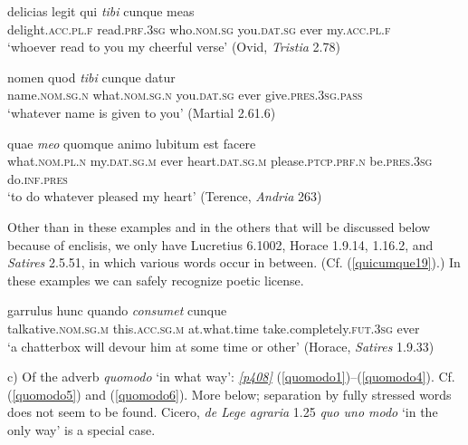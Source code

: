 \begin{exe}
\ex
\gll delicias legit qui \emph{tibi} cunque meas\\
delight.\textsc{acc.pl.f} read.\textsc{prf.3sg} who.\textsc{nom.sg} you.\textsc{dat.sg} ever my.\textsc{acc.pl.f}\\
\trans `whoever read to you my cheerful verse' (Ovid, \textit{Tristia} 2.78)
\label{quicumque16}
\end{exe}

\begin{exe}
\ex
\gll nomen quod \emph{tibi} cunque datur\\
name.\textsc{nom.sg.n} what.\textsc{nom.sg.n} you.\textsc{dat.sg} ever give.\textsc{pres.3sg.pass}\\
\trans `whatever name is given to you' (Martial 2.61.6)
\label{quicumque17}
\end{exe}

\begin{exe}
\ex
\gll quae \emph{meo} quomque animo lubitum est facere\\
what.\textsc{nom.pl.n} my.\textsc{dat.sg.m} ever heart.\textsc{dat.sg.m} please.\textsc{ptcp.prf.n} be.\textsc{pres.3sg} do.\textsc{inf.pres}\\
\trans `to do whatever pleased my heart' (Terence, \textit{Andria} 263)
\label{quicumque18}
\end{exe}

Other than in these examples and in the others that will be discussed below because of enclisis, we only have Lucretius 6.1002, Horace 1.9.14, 1.16.2, and \textit{Satires} 2.5.51, in which various words occur in between. (Cf. (\ref{quicumque19}).) In these examples we can safely recognize poetic license.

\begin{exe}
\ex
\gll garrulus hunc quando \emph{consumet} cunque\\
talkative.\textsc{nom.sg.m} this.\textsc{acc.sg.m} at.what.time take.completely.\textsc{fut.3sg} ever\\
\trans `a chatterbox will devour him at some time or other' (Horace, \textit{Satires} 1.9.33)
\label{quicumque19}
\end{exe}

c) Of the adverb \emph{quomodo} `in what way': \hyperlink{p408}{\emph{[p408]}} (\ref{quomodo1})--(\ref{quomodo4}). Cf. (\ref{quomodo5}) and (\ref{quomodo6}). More below; separation by fully stressed words does not seem to be found. Cicero, \textit{de Lege agraria} 1.25 \emph{quo uno modo} `in the only way' is a special case.

